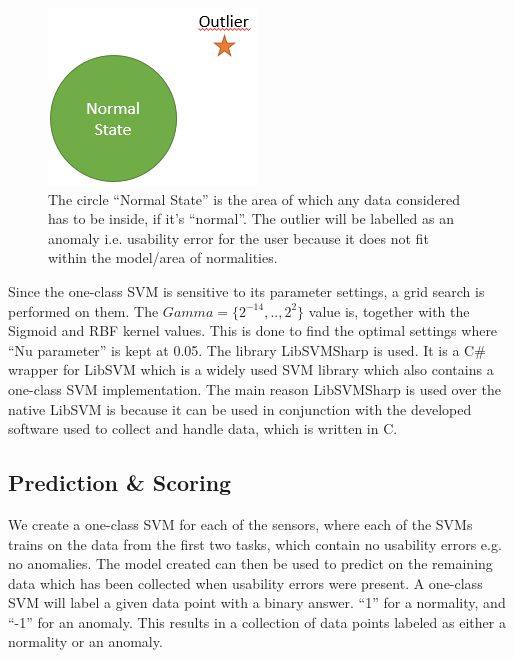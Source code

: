 \begin{figure}
    \centering
  \includegraphics[width=0.75\columnwidth]{graphics/oneclass-svm.png}
    \caption{The circle ``Normal State'' is the area of which any data considered has to be inside, if it's ``normal''. The outlier will be labelled as an anomaly i.e. usability error for the user because it does not fit within the model/area of normalities. }
    \label{[FIGURE] OneClass SVM}
\end{figure}

Since the one-class SVM is sensitive\cite{oneClassSVM} to its parameter settings, a grid search is performed on them. The $Gamma = \{2^{-14},..,2^2\}$ value is, together with the Sigmoid and RBF kernel values. This is done to find the optimal settings where ``Nu parameter'' is kept at 0.05.
The library LibSVMSharp\cite{libsvmsharp} is used. It is a C\# wrapper for LibSVM\cite{libsvm} which is a widely used SVM library which also contains a one-class SVM implementation. The main reason LibSVMSharp is used over the native LibSVM is because it can be used in conjunction with the developed software used to collect and handle data, which is written in C.

\subsection{Prediction \& Scoring}
We create a one-class SVM for each of the sensors, where each of the SVMs trains on the data from the first two tasks, which contain no usability errors e.g. no anomalies. The model created can then be used to predict on the remaining data which has been collected when usability errors were present.
A one-class SVM will label a given data point with a binary answer. ``1'' for a normality, and ``-1'' for an anomaly.
This results in a collection of data points labeled as either a normality or an anomaly.

